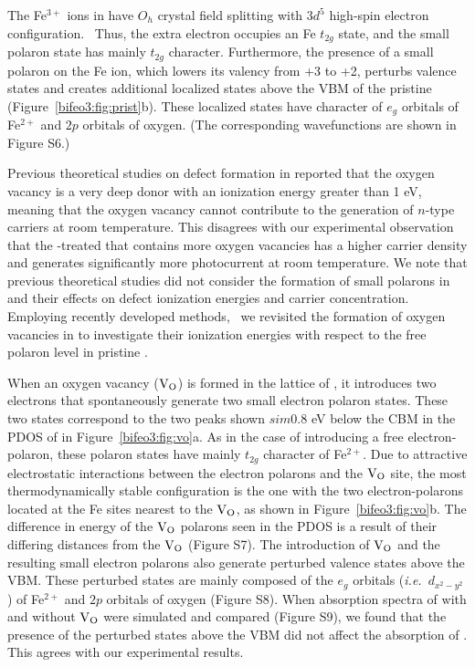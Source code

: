 The Fe$^{3+}$ ions in  have $O_h$ crystal field splitting with $3d^5$ high-spin electron configuration.~\cite{baettig2005first} Thus, the extra electron occupies an Fe $t_{2g}$ state, and the small polaron state has mainly $t_{2g}$ character. Furthermore, the presence of a small polaron on the Fe ion, which lowers its valency from +3 to +2, perturbs valence states and creates additional localized states above the VBM of the pristine  (Figure~\ref{bifeo3:fig:prist}b). These localized states have character of $e_g$ orbitals of Fe$^{2+}$ and $2p$ orbitals of oxygen. (The corresponding wavefunctions are shown in Figure S6.)


Previous theoretical studies on defect formation in  reported that the oxygen vacancy is a very deep donor with an ionization energy greater than 1 eV,~\cite{paudel2012intrinsic,kay2006new,zhang2010density,shimada2016multiferroic} meaning that the oxygen vacancy cannot contribute to the generation of $n$-type carriers at room temperature. This disagrees with our experimental observation that the -treated  that contains more oxygen vacancies has a higher carrier density and generates significantly more photocurrent at room temperature. We note that previous theoretical studies did not consider the formation of small polarons in  and their effects on defect ionization energies and carrier concentration. Employing recently developed methods,~\cite{smart2017effect,seo2018role} we revisited the formation of oxygen vacancies in  to investigate their ionization energies with respect to the free polaron level in pristine .

When an oxygen vacancy ($\rm V_O$) is formed in the lattice of , it introduces two electrons that spontaneously generate two small electron polaron states. These two states correspond to the two peaks shown $sim$0.8 eV below the CBM in the PDOS of  in Figure~\ref{bifeo3:fig:vo}a. As in the case of introducing a free electron-polaron, these polaron states have mainly $t_{2g}$ character of Fe$^{2+}$. Due to attractive electrostatic interactions between the electron polarons and the $\rm V_O$ site, the most thermodynamically stable configuration is the one with the two electron-polarons located at the Fe sites nearest to the $\rm V_O$, as shown in Figure~\ref{bifeo3:fig:vo}b. The difference in energy of the $\rm V_O$ polarons seen in the PDOS is a result of their differing distances from the $\rm V_O$ (Figure S7). The introduction of $\rm V_O$ and the resulting small electron polarons also generate perturbed valence states above the VBM. These perturbed states are mainly composed of the $e_g$ orbitals (\textit{i.e.}\ $d_{x^2-y^2}$) of Fe$^{2+}$ and $2p$ orbitals of oxygen (Figure S8). When absorption spectra of  with and without $\rm V_O$ were simulated and compared (Figure S9), we found that the presence of the perturbed states above the VBM did not affect the absorption of . This agrees with our experimental results.


